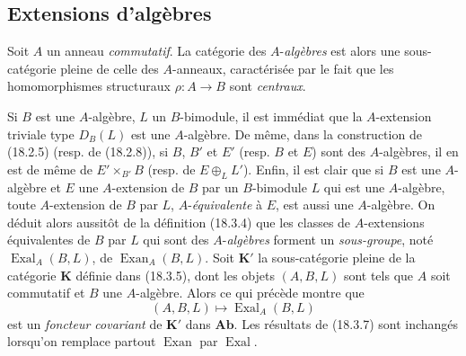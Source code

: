 \subsection{Extensions d'algèbres}
\label{subsection:0.18.4-fr}

\begin{env}[18.4.1]
\label{0.18.4.1-fr}
Soit $A$ un anneau \emph{commutatif}. La catégorie des $A$-\emph{algèbres} est
alors une sous-catégorie pleine de celle des $A$-anneaux, caractérisée par le
fait que les homomorphismes structuraux $\rho:A\to B$ sont \emph{centraux}.

Si $B$ est une $A$-algèbre, $L$ un $B$-bimodule, il est immédiat que la
$A$-extension triviale type $D_B(L)$ est une $A$-algèbre. De même, dans la
construction de (18.2.5) (resp. de (18.2.8)), si $B$, $B'$ et $E'$ (resp.
$B$ et $E$) sont des $A$-algèbres, il en est de même de
$E'\times_{B'}B$ (resp. de $E\oplus_LL'$). Enfin, il est clair que si $B$ est
une $A$-algèbre et $E$ une $A$-extension de $B$ par un $B$-bimodule $L$ qui
est une $A$-algèbre, toute $A$-extension de $B$ par $L$, $A$-\emph{équivalente}
à $E$, est aussi une $A$-algèbre. On déduit alors aussitôt de la définition
(18.3.4) que les classes de $A$-extensions équivalentes de $B$ par $L$ qui
sont des $A$-\emph{algèbres} forment un \emph{sous-groupe}, noté
$\operatorname{Exal}_A(B,L)$, de $\operatorname{Exan}_A(B,L)$. Soit
$\mathbf K'$ la sous-catégorie pleine de la catégorie $\mathbf K$ définie dans
(18.3.5), dont les objets $(A,B,L)$ sont tels que $A$ soit commutatif et $B$
une $A$-algèbre. Alors ce qui précède montre que
\[
  (A,B,L)\longmapsto\operatorname{Exal}_A(B,L)
\]
est un \emph{foncteur covariant} de $\mathbf K'$ dans $\mathbf{Ab}$. Les
résultats de (18.3.7) sont inchangés lorsqu'on remplace partout
$\operatorname{Exan}$ par $\operatorname{Exal}$.
\end{env}

